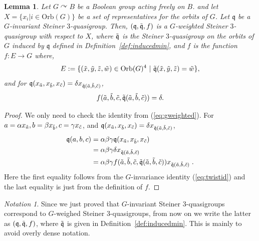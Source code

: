 \documentclass{article}
\newtheorem{lemma}[theorem]{Lemma}
\theoremstyle{remark}
\newtheorem{notation}[theorem]{Notation}
\theoremstyle{definition}
\def\acts{\curvearrowright}
\begin{document}
\begin{lemma}\label{lem:inducedf} Let $G\acts B$ be a Boolean group acting freely on $B$. and let $X=\{ x_i \vert i\in \mathrm{Orb}(G)\}$ be a set of representatives for the orbits of $G$. Let $\mathfrak{q}$ be a $G$-invariant Steiner $3$-quasigroup. Then, $(\mathfrak{q}, \Tilde{\mathfrak{q}}, f)$ is a $G$-weighted Steiner $3$-quasigroup with respect to $X$, where $\Tilde{\mathfrak{q}}$ is the Steiner $3$-quasigroup on the orbits of $G$ induced by $\mathfrak{q}$ defined in Definition~\ref{def:inducedmin}, and $f$ is the function $f:E\to G$ where, 
\[E:=\{(\Tilde{x}, \Tilde{y}, \Tilde{z}, \Tilde{w})\in\mathrm{Orb}(G)^4\ \vert \ \Tilde{\mathfrak{q}}(\Tilde{x}, \Tilde{y}, \Tilde{z})= \Tilde{w}\},\]
and for $\mathfrak{q}(x_{\Tilde{a}}, x_{\Tilde{b}}, x_{\Tilde{c}})=\delta x_{\Tilde{\mathfrak{q}}(\Tilde{a},\Tilde{b}, \Tilde{c})}$,
\[f(\Tilde{a},\Tilde{b}, \Tilde{c}, \Tilde{\mathfrak{q}}(\Tilde{a},\Tilde{b}, \Tilde{c}))=\delta.\] 
\end{lemma}
\begin{proof} We only need to check the identity from (\ref{eq:gweighted}).   For $a=\alpha x_{\Tilde{a}}, b=\beta x_{\Tilde{b}}, c=\gamma x_{\Tilde{c}}$, and $\mathfrak{q}(x_{\Tilde{a}}, x_{\Tilde{b}}, x_{\Tilde{c}})=\delta x_{\Tilde{\mathfrak{q}}(\Tilde{a},\Tilde{b}, \Tilde{c})}$,
\begin{align*}
\mathfrak{q}(a, b, c)&=\alpha\beta\gamma \mathfrak{q}(x_{\Tilde{a}}, x_{\Tilde{b}}, x_{\Tilde{c}})\\
&=\alpha \beta \gamma \delta x_{\Tilde{\mathfrak{q}}(\Tilde{a},\Tilde{b}, \Tilde{c})}\\
&=\alpha \beta \gamma f(\Tilde{a},\Tilde{b}, \Tilde{c}, \Tilde{\mathfrak{q}}(\Tilde{a},\Tilde{b}, \Tilde{c})) x_{\Tilde{\mathfrak{q}}(\Tilde{a},\Tilde{b}, \Tilde{c})}\;. 
\end{align*}
Here the first equality follows from the $G$-invariance identity (\ref{eq:twistid}) and the last equality is just from the definition of $f$.
\end{proof}

\begin{notation} Since we just proved that $G$-invariant Steiner $3$-quasigroups correspond to $G$-weighed Steiner $3$-quasigroups, from now on we write the latter as $(\mathfrak{q}, \Tilde{\mathfrak{q}}, f)$, where $\Tilde{\mathfrak{q}}$ is given in Definition~\ref{def:inducedmin}. This is mainly to avoid overly dense notation.
\end{notation}
\end{document}
